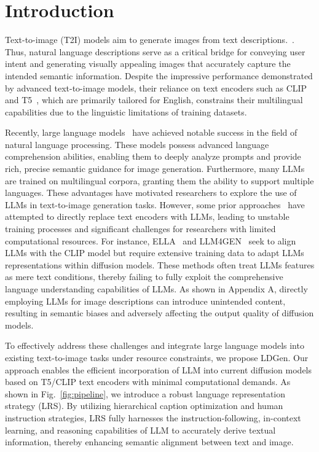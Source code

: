 \section{Introduction}

Text-to-image (T2I) models aim to generate images from text descriptions.~\cite{rombach2022high,podell2023sdxl,saharia2022photorealistic,bai2024meissonic,nichol2022glide}. Thus, natural language descriptions serve as a critical bridge for conveying user intent and generating visually appealing images that accurately capture the intended semantic information. Despite the impressive performance demonstrated by advanced text-to-image models, their reliance on text encoders such as CLIP~\cite{radford2021learning} and T5~\cite{raffel2020exploring}, which are primarily tailored for English, 
constrains their multilingual capabilities due to the linguistic limitations of training datasets.

Recently, large language models~\cite{bai2023qwen,liu2024deepseek,achiam2023gpt,glm2024chatglm,dubey2024llama} have achieved notable success in the field of natural language processing. These models possess advanced language comprehension abilities, enabling them to deeply analyze prompts and provide rich, precise semantic guidance for image generation. Furthermore, many LLMs~\cite{team2024gemma,bai2023qwen,achiam2023gpt} are trained on multilingual corpora, granting them the ability to support multiple languages. These advantages have motivated researchers to explore the use of LLMs in text-to-image generation tasks. However, some prior approaches~\cite{xie2024sana,ma2024exploring,xing2024mulan,ye2024altdiffusion} have attempted to directly replace text encoders with LLMs, leading to unstable training processes and significant challenges for researchers with limited computational resources. For instance, ELLA~\cite{hu2024ella} and LLM4GEN~\cite{liu2024llm4genleveragingsemanticrepresentation} seek to align LLMs with the CLIP model but require extensive training data to adapt LLMs representations within diffusion models. These methods often treat LLMs features as mere text conditions, thereby failing to fully exploit the comprehensive language understanding capabilities of LLMs. As shown in Appendix A, directly employing LLMs for image descriptions can introduce unintended content, resulting in semantic biases and adversely affecting the output quality of diffusion models.


To effectively address these challenges and integrate large language models into existing text-to-image tasks under resource constraints, we propose LDGen. Our approach enables the efficient incorporation of LLM into current diffusion models based on T5/CLIP text encoders with minimal computational demands. As shown in Fig.~\ref{fig:pipeline}, we introduce a robust language representation strategy (LRS). By utilizing hierarchical caption optimization and human instruction strategies, LRS fully harnesses the instruction-following, in-context learning, and reasoning capabilities of LLM to accurately derive textual information, thereby enhancing semantic alignment between text and image.

